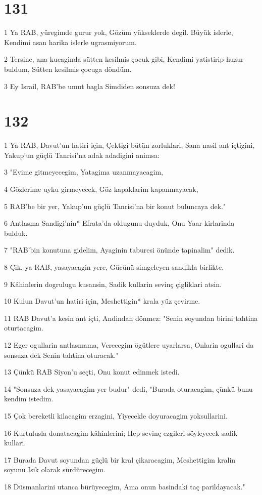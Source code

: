 \chapter{131}

\par 1 Ya RAB, yüregimde gurur yok, Gözüm yükseklerde degil. Büyük islerle, Kendimi asan harika islerle ugrasmiyorum.
\par 2 Tersine, ana kucaginda sütten kesilmis çocuk gibi, Kendimi yatistirip huzur buldum, Sütten kesilmis çocuga döndüm.
\par 3 Ey Israil, RAB'be umut bagla Simdiden sonsuza dek!

\chapter{132}

\par 1 Ya RAB, Davut'un hatiri için, Çektigi bütün zorluklari, Sana nasil ant içtigini, Yakup'un güçlü Tanrisi'na adak adadigini animsa:
\par 3 "Evime gitmeyecegim, Yatagima uzanmayacagim,
\par 4 Gözlerime uyku girmeyecek, Göz kapaklarim kapanmayacak,
\par 5 RAB'be bir yer, Yakup'un güçlü Tanrisi'na bir konut buluncaya dek."
\par 6 Antlasma Sandigi'nin* Efrata'da oldugunu duyduk, Onu Yaar kirlarinda bulduk.
\par 7 "RAB'bin konutuna gidelim, Ayaginin taburesi önünde tapinalim" dedik.
\par 8 Çik, ya RAB, yasayacagin yere, Gücünü simgeleyen sandikla birlikte.
\par 9 Kâhinlerin dogrulugu kusansin, Sadik kullarin sevinç çigliklari atsin.
\par 10 Kulun Davut'un hatiri için, Meshettigin* krala yüz çevirme.
\par 11 RAB Davut'a kesin ant içti, Andindan dönmez: "Senin soyundan birini tahtina oturtacagim.
\par 12 Eger ogullarin antlasmama, Verecegim ögütlere uyarlarsa, Onlarin ogullari da sonsuza dek Senin tahtina oturacak."
\par 13 Çünkü RAB Siyon'u seçti, Onu konut edinmek istedi.
\par 14 "Sonsuza dek yasayacagim yer budur" dedi, "Burada oturacagim, çünkü bunu kendim istedim.
\par 15 Çok bereketli kilacagim erzagini, Yiyecekle doyuracagim yoksullarini.
\par 16 Kurtulusla donatacagim kâhinlerini; Hep sevinç ezgileri söyleyecek sadik kullari.
\par 17 Burada Davut soyundan güçlü bir kral çikaracagim, Meshettigim kralin soyunu Isik olarak sürdürecegim.
\par 18 Düsmanlarini utanca bürüyecegim, Ama onun basindaki taç parildayacak."

